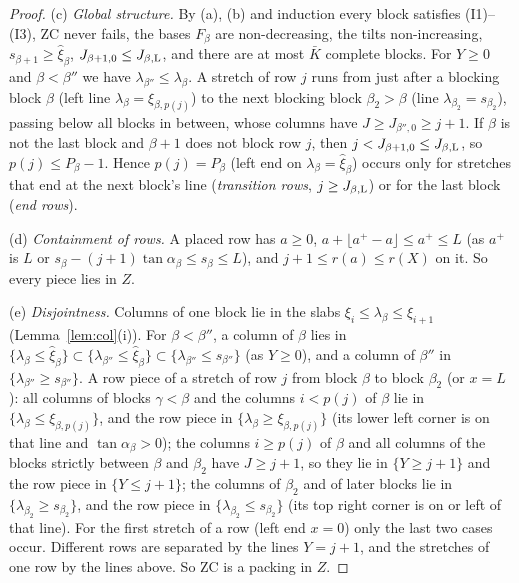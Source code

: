 \documentclass[11pt]{amsart}
\newcommand{\Kb}{\bar K}
\theoremstyle{definition}
\theoremstyle{remark}
\numberwithin{equation}{section}
\begin{document}
\begin{proof}
(c) \emph{Global structure.} By (a), (b) and induction every block satisfies (I1)--(I3), ZC never fails, the bases
$F_\beta$ are non-decreasing, the tilts non-increasing, $s_{\beta+1}\ge\hat\xi_\beta$, $J_{\beta+1,0}\le J_{\beta,\rm L}$, and
there are at most $\Kb$ complete blocks. For $Y\ge0$ and $\beta<\beta''$ we have $\lambda_{\beta''}\le\lambda_\beta$.
A stretch of row $j$ runs from just after a blocking block $\beta$ (left line $\lambda_\beta=\xi_{\beta,p(j)}$) to the
next blocking block $\beta_2>\beta$ (line $\lambda_{\beta_2}=s_{\beta_2}$), passing below all blocks in between, whose
columns have $J\ge J_{\beta'',0}\ge j+1$. If $\beta$ is not the last block and $\beta+1$ does not block row $j$, then
$j<J_{\beta+1,0}\le J_{\beta,\rm L}$, so $p(j)\le P_\beta-1$. Hence $p(j)=P_\beta$ (left end on
$\lambda_\beta=\hat\xi_\beta$) occurs only for stretches that end at the next block's line (\emph{transition rows},
$j\ge J_{\beta,\rm L}$) or for the last block (\emph{end rows}).

(d) \emph{Containment of rows.} A placed row has $a\ge0$, $a+\lfloor a^+-a\rfloor\le a^+\le L$ (as $a^+$ is $L$ or
$s_\beta-(j+1)\tan\alpha_\beta\le s_\beta\le L$), and $j+1\le r(a)\le r(X)$ on it. So every piece lies in $Z$.

(e) \emph{Disjointness.} Columns of one block lie in the slabs $\xi_i\le\lambda_\beta\le\xi_{i+1}$
(Lemma~\ref{lem:col}(i)). For $\beta<\beta''$, a column of $\beta$ lies in
$\{\lambda_\beta\le\hat\xi_\beta\}\subset\{\lambda_{\beta''}\le\hat\xi_\beta\}\subset\{\lambda_{\beta''}\le s_{\beta''}\}$
(as $Y\ge0$), and a column of $\beta''$ in $\{\lambda_{\beta''}\ge s_{\beta''}\}$. A row piece of a stretch of row $j$
from block $\beta$ to block $\beta_2$ (or $x=L$): all columns of blocks $\gamma<\beta$ and the columns $i<p(j)$ of $\beta$
lie in $\{\lambda_\beta\le\xi_{\beta,p(j)}\}$, and the row piece in $\{\lambda_\beta\ge\xi_{\beta,p(j)}\}$ (its lower left
corner is on that line and $\tan\alpha_\beta>0$); the columns $i\ge p(j)$ of $\beta$ and all columns of the blocks
strictly between $\beta$ and $\beta_2$ have $J\ge j+1$, so they lie in $\{Y\ge j+1\}$ and the row piece in
$\{Y\le j+1\}$; the columns of $\beta_2$ and of later blocks lie in $\{\lambda_{\beta_2}\ge s_{\beta_2}\}$, and the row
piece in $\{\lambda_{\beta_2}\le s_{\beta_2}\}$ (its top right corner is on or left of that line). For the first stretch
of a row (left end $x=0$) only the last two cases occur. Different rows are separated by the lines $Y=j+1$, and the
stretches of one row by the lines above. So ZC is a packing in $Z$.


\end{proof}
\end{document}
